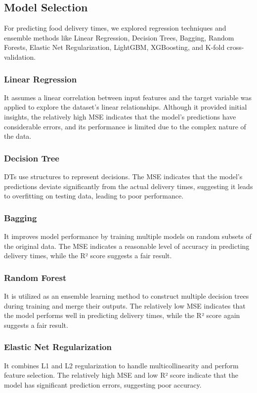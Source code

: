 \documentclass[10pt,twocolumn,letterpaper]{article}
\begin{document}
    \subsection{Model Selection}
        For predicting food delivery times, we explored regression techniques and ensemble methods like Linear Regression, Decision Trees, Bagging, Random Forests, Elastic Net Regularization, LightGBM, XGBoosting, and K-fold cross-validation.

        \subsubsection{Linear Regression}
            It assumes a linear correlation between input features and the target variable was applied to explore the dataset’s linear relationships. Although it provided initial insights, the relatively high MSE indicates that the model's predictions have considerable errors, and its performance is limited due to the complex nature of the data.

        \subsubsection{Decision Tree}
            DTs use structures to represent decisions. The MSE indicates that the model's predictions deviate significantly from the actual delivery times, suggesting it leads to overfitting on testing data, leading to poor performance.

        \subsubsection{Bagging}
            It improves model performance by training multiple models on random subsets of the original data. The MSE indicates a reasonable level of accuracy in predicting delivery times, while the R² score suggests a fair result.

        \subsubsection{Random Forest}
            It is utilized as an ensemble learning method to construct multiple decision trees during training and merge their outputs. The relatively low MSE indicates that the model performs well in predicting delivery times, while the R² score again suggests a fair result.

        \subsubsection{Elastic Net Regularization}
            It combines L1 and L2 regularization to handle multicollinearity and perform feature selection. The relatively high MSE and low R² score indicate that the model has significant prediction errors, suggesting poor accuracy.
\end{document}

